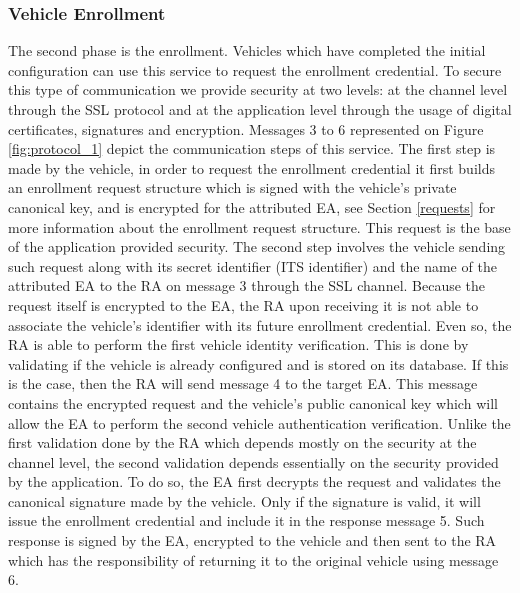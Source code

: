 \subsubsection{Vehicle Enrollment} \label{enroll}
The second phase is the enrollment. Vehicles which have completed the initial configuration can use this service to request the enrollment credential. To secure this type of communication we provide security at two levels: at the channel level through the SSL protocol and at the application level through the usage of digital certificates, signatures and encryption. Messages 3 to 6 represented on Figure \ref{fig:protocol_1} depict the communication steps of this service. The first step is made by the vehicle, in order to request the enrollment credential it first builds an enrollment request structure which is signed with the vehicle's private canonical key, and is encrypted for the attributed EA, see Section \ref{requests} for more information about the enrollment request structure. This request is the base of the application provided security. The second step involves the vehicle sending such request along with its secret identifier (ITS identifier) and the name of the attributed EA to the RA on message 3 through the SSL channel. Because the request itself is encrypted to the EA, the RA upon receiving it is not able to associate the vehicle's identifier with its future enrollment credential. Even so, the RA is able to perform the first vehicle identity verification. This is done by validating if the vehicle is already configured and is stored on its database. If this is the case, then the RA will send message 4 to the target EA. This message contains the encrypted request and the vehicle's public canonical key which will allow the EA to perform the second vehicle authentication verification. Unlike the first validation done by the RA which depends mostly on the security at the channel level, the second validation depends essentially on the security provided by the application. To do so, the EA first decrypts the request and validates the canonical signature made by the vehicle. Only if the signature is valid, it will issue the enrollment credential and include it in the response message 5. Such response is signed by the EA, encrypted to the vehicle and then sent to the RA which has the responsibility of returning it to the original vehicle using message 6.


